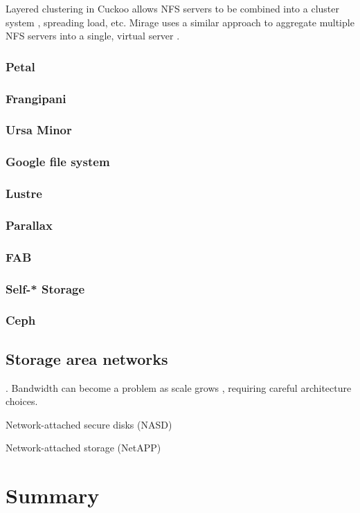 \cite{amiri}

Layered clustering in Cuckoo allows NFS servers to be combined into a cluster system \cite{klosterman}, spreading load, etc. Mirage uses a similar approach to aggregate multiple NFS servers into a single, virtual server \cite{baker02}.

\subsubsection{Petal}
\cite{lee95,lee96}
\subsubsection{Frangipani}
\cite{thekkath}
\subsubsection{Ursa Minor}
\cite{abd-el-malek}
\subsubsection{Google file system}
\cite{ghemawat}
\subsubsection{Lustre}
\cite{lustre}
\subsubsection{Parallax}
\cite{warfield}
\subsubsection{FAB}
\cite{frolund,saito04,ji}
\subsubsection{Self-* Storage}
\cite{ganger}
\subsubsection{Ceph}
\cite{weil}

\subsection{Storage area networks}
\cite{burns}. Bandwidth can become a problem as scale grows \cite{hospodor}, requiring careful architecture choices.

Network-attached secure disks (NASD) \cite{gibson97,gibson98a}

Network-attached storage (NetAPP) \cite{hitz}

\section{Summary}
